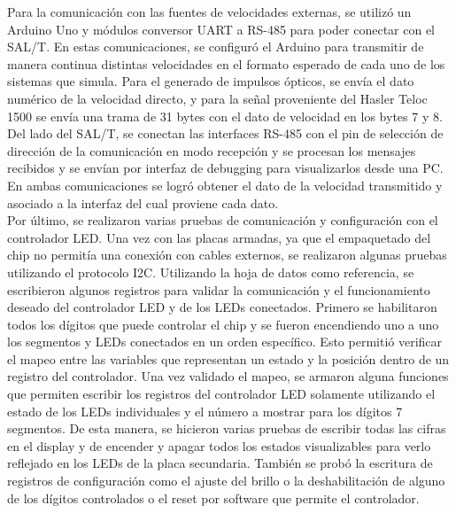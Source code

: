 Para la comunicación con las fuentes de velocidades externas, se utilizó un Arduino Uno y módulos conversor UART a RS-485 para poder conectar con el SAL/T. En estas comunicaciones, se configuró el Arduino para transmitir de manera continua distintas velocidades en el formato esperado de cada uno de los sistemas que simula. Para el generado de impulsos ópticos, se envía el dato numérico de la velocidad directo, y para la señal proveniente del Hasler Teloc 1500 se envía una trama de 31 bytes con el dato de velocidad en los bytes 7 y 8. Del lado del SAL/T, se conectan las interfaces RS-485 con el pin de selección de dirección de la comunicación en modo recepción y se procesan los mensajes recibidos y se envían por interfaz de debugging para visualizarlos desde una PC. En ambas comunicaciones se logró obtener el dato de la velocidad transmitido y asociado a la interfaz del cual proviene cada dato. \\ 

Por último, se realizaron varias pruebas de comunicación y configuración con el controlador LED. Una vez con las placas armadas, ya que el empaquetado del chip no permitía una conexión con cables externos, se realizaron algunas pruebas utilizando el protocolo I2C. Utilizando la hoja de datos como referencia, se escribieron algunos registros para validar la comunicación y el funcionamiento deseado del controlador LED y de los LEDs conectados. Primero se habilitaron todos los dígitos que puede controlar el chip y se fueron encendiendo uno a uno los segmentos y LEDs conectados en un orden específico. Esto permitió verificar el mapeo entre las variables que representan un estado y la posición dentro de un registro del controlador. Una vez validado el mapeo, se armaron alguna funciones que permiten escribir los registros del controlador LED solamente utilizando el estado de los LEDs individuales y el número a mostrar para los dígitos 7 segmentos. De esta manera, se hicieron varias pruebas de escribir todas las cifras en el display y de encender y apagar todos los estados visualizables para verlo reflejado en los LEDs de la placa secundaria. También se probó la escritura de registros de configuración como el ajuste del brillo o la deshabilitación de alguno de los dígitos controlados o el reset por software que permite el controlador. 